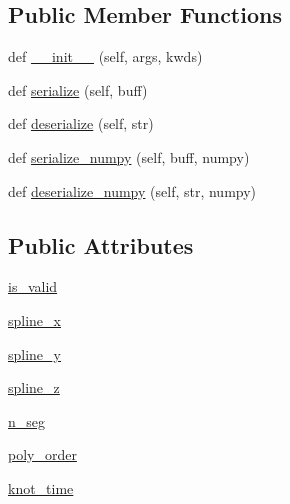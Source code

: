 \subsection*{Public Member Functions}
\begin{DoxyCompactItemize}
\item 
def \hyperlink{classtraj__gen_1_1msg_1_1___poly_spline_x_y_z_1_1_poly_spline_x_y_z_a2826aff376174a6cfdce5376a693c7cf}{\+\_\+\+\_\+init\+\_\+\+\_\+} (self, args, kwds)
\item 
def \hyperlink{classtraj__gen_1_1msg_1_1___poly_spline_x_y_z_1_1_poly_spline_x_y_z_a7378f3f54db87638a865e2b228e835a7}{serialize} (self, buff)
\item 
def \hyperlink{classtraj__gen_1_1msg_1_1___poly_spline_x_y_z_1_1_poly_spline_x_y_z_ab994d22256f65767bdf46fec77a43979}{deserialize} (self, str)
\item 
def \hyperlink{classtraj__gen_1_1msg_1_1___poly_spline_x_y_z_1_1_poly_spline_x_y_z_aaeac81adae206d1d2053e4078b1dd4f9}{serialize\+\_\+numpy} (self, buff, numpy)
\item 
def \hyperlink{classtraj__gen_1_1msg_1_1___poly_spline_x_y_z_1_1_poly_spline_x_y_z_aa35662faebc2d49a8f52e96714539fe8}{deserialize\+\_\+numpy} (self, str, numpy)
\end{DoxyCompactItemize}
\subsection*{Public Attributes}
\begin{DoxyCompactItemize}
\item 
\hyperlink{classtraj__gen_1_1msg_1_1___poly_spline_x_y_z_1_1_poly_spline_x_y_z_a898ea3519aafc59e84222844042a5876}{is\+\_\+valid}
\item 
\hyperlink{classtraj__gen_1_1msg_1_1___poly_spline_x_y_z_1_1_poly_spline_x_y_z_a3a53e3b645ebf7e3e2348cc0b109270c}{spline\+\_\+x}
\item 
\hyperlink{classtraj__gen_1_1msg_1_1___poly_spline_x_y_z_1_1_poly_spline_x_y_z_a4041178e81d5cf3ba4b2f72cedc9bdb5}{spline\+\_\+y}
\item 
\hyperlink{classtraj__gen_1_1msg_1_1___poly_spline_x_y_z_1_1_poly_spline_x_y_z_a4e4226ec1ac7dea49a81a5ae4b98db1b}{spline\+\_\+z}
\item 
\hyperlink{classtraj__gen_1_1msg_1_1___poly_spline_x_y_z_1_1_poly_spline_x_y_z_a9964ecf9e41c4257825fc021a387d596}{n\+\_\+seg}
\item 
\hyperlink{classtraj__gen_1_1msg_1_1___poly_spline_x_y_z_1_1_poly_spline_x_y_z_aca5acdafacdb1eaad54896b41b24bff6}{poly\+\_\+order}
\item 
\hyperlink{classtraj__gen_1_1msg_1_1___poly_spline_x_y_z_1_1_poly_spline_x_y_z_adf0cb1ba860ae7320d770e719b6c1f08}{knot\+\_\+time}
\end{DoxyCompactItemize}


